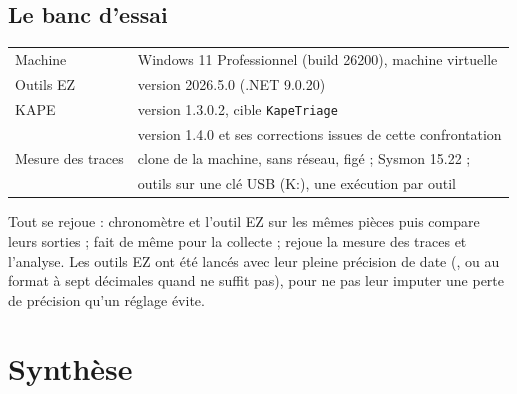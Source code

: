 \documentclass[11pt,a4paper,oneside]{report}
\begin{document}
\section{Le banc d'essai}

\begin{tabular}{@{}ll@{}}
Machine & Windows 11 Professionnel (build 26200), machine virtuelle \\
Outils EZ & version 2026.5.0 (.NET 9.0.20) \\
KAPE & version 1.3.0.2, cible \texttt{KapeTriage} \\
\wac{} & version 1.4.0 et ses corrections issues de cette confrontation \\
Mesure des traces & clone de la machine, sans réseau, figé ; Sysmon 15.22 ; \\
                  & outils sur une clé USB (K:), une exécution par outil \\
\end{tabular}

Tout se rejoue :  chronomètre \wac{}
et l'outil EZ sur les mêmes pièces puis compare leurs sorties ;
 fait de même pour la collecte ;
 rejoue la mesure des traces et
 l'analyse. Les outils EZ ont
été lancés avec leur pleine précision de date (, ou  au format
à sept décimales quand  ne suffit pas), pour ne pas leur imputer une
perte de précision qu'un réglage évite.

\chapter{Synthèse}
\end{document}
